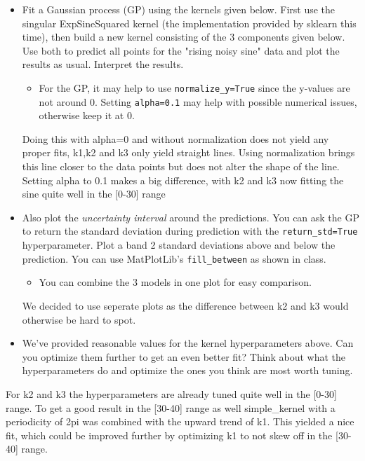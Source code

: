 \documentclass[11pt]{article}
\providecommand{\tightlist}{%
      \setlength{\itemsep}{0pt}\setlength{\parskip}{0pt}}
\begin{document}
\begin{itemize}
\item
  Fit a Gaussian process (GP) using the kernels given below. First use
  the singular ExpSineSquared kernel (the implementation provided by
  sklearn this time), then build a new kernel consisting of the 3
  components given below. Use both to predict all points for the "rising
  noisy sine" data and plot the results as usual. Interpret the results.

  \begin{itemize}
  \tightlist
  \item
    For the GP, it may help to use \texttt{normalize\_y=True} since the
    y-values are not around 0. Setting \texttt{alpha=0.1} may help with
    possible numerical issues, otherwise keep it at 0.
  \end{itemize}

  Doing this with alpha=0 and without normalization does not yield any
  proper fits, k1,k2 and k3 only yield straight lines. Using
  normalization brings this line closer to the data points but does not
  alter the shape of the line. Setting alpha to 0.1 makes a big
  difference, with k2 and k3 now fitting the sine quite well in the
  {[}0-30{]} range
\item
  Also plot the \emph{uncertainty interval} around the predictions. You
  can ask the GP to return the standard deviation during prediction with
  the \texttt{return\_std=True} hyperparameter. Plot a band 2 standard
  deviations above and below the prediction. You can use MatPlotLib's
  \texttt{fill\_between} as shown in class.

  \begin{itemize}
  \tightlist
  \item
    You can combine the 3 models in one plot for easy comparison.
  \end{itemize}

  We decided to use seperate plots as the difference between k2 and k3
  would otherwise be hard to spot.
\item
  We've provided reasonable values for the kernel hyperparameters above.
  Can you optimize them further to get an even better fit? Think about
  what the hyperparameters do and optimize the ones you think are most
  worth tuning.
\end{itemize}

For k2 and k3 the hyperparameters are already tuned quite well in the
{[}0-30{]} range. To get a good result in the {[}30-40{]} range as well
simple\_kernel with a periodicity of 2pi was combined with the upward
trend of k1. This yielded a nice fit, which could be improved further by
optimizing k1 to not skew off in the {[}30-40{]} range.
\end{document}
